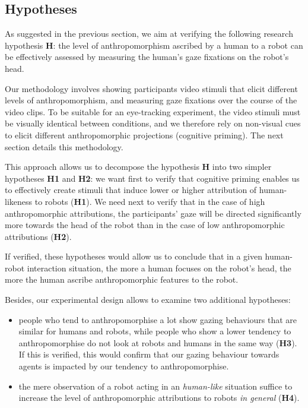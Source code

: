 \documentclass[lettersize, noapacite, twoside, HRI]{apa_HRI}
\newcommand{\vs}{\textit{vs.}\xspace}
\newcommand{\h}[1]{\textbf{H#1}\xspace}
\begin{document}
\subsection{Hypotheses}

As suggested in the previous section, we aim at verifying the following research
hypothesis \h{}: the level of anthropomorphism ascribed by a human to a robot can be
effectively assessed by measuring the human's gaze fixations on the robot's head.

Our methodology involves showing participants video stimuli that elicit
different levels of anthropomorphism, and measuring gaze fixations over the
course of the video clips. To be suitable for an eye-tracking experiment, the
video stimuli must be visually identical between conditions, and we therefore
rely on non-visual cues to elicit different anthropomorphic projections
(cognitive priming). The next section details this methodology.

This approach allows us to decompose the hypothesis \h{} into two simpler
hypotheses \h{1} and \h{2}:  we want first to verify that cognitive priming
enables us to effectively create stimuli that induce lower or higher attribution
of human-likeness to robots (\h{1}).  We need next to verify that in the case of
high anthropomorphic attributions, the participants' gaze will be directed
significantly more towards the head of the robot than in the case of low
anthropomorphic attributions (\h{2}). 


If verified, these hypotheses would allow us to conclude that in a given
human-robot interaction situation, the more a human focuses on the robot's head,
the more the human ascribe anthropomorphic features to the robot.


\vspace{1em}

Besides, our experimental design allows to examine two additional hypotheses:

\begin{itemize}
    \item people who tend to anthropomorphise a lot show gazing behaviours that
        are similar for humans and robots, while people who show a lower
        tendency to anthropomorphise do not look at robots and humans in the
        same way (\h{3}). If this is verified, this would confirm that our
        gazing behaviour towards agents is impacted by our tendency to
        anthropomorphise.

    \item the mere observation of a robot acting in an \emph{human-like}
        situation suffice to increase the level of
        anthropomorphic attributions to robots \emph{in general} (\h{4}).
\end{itemize}
\end{document}
